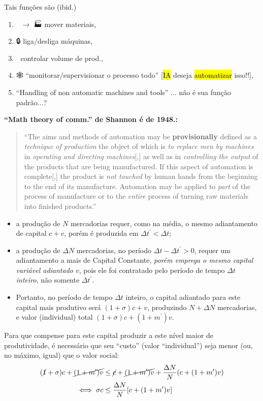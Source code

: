 Tais funções são (ibid.)

\begin{enumerate}
\item 🚜 $\rightarrow$ 🏭 mover materiais,
\item 🔒 liga/desliga máquinas,
\item 🧭 controlar volume de prod.,
\item 🕸️ ``monitorar/supervisionar o processo todo'' [\hl{IA} deseja \hl{automatizar} isso!!],
\item ``Handling of non automatic machines and tools'' $\dots$ não é sua função padrão...?
\end{enumerate}

\textbf{``Math theory of comm.'' de Shannon é de 1948.:} 
\begin{quote}
``The aims and methods of automation may be \textbf{provisionally} defined as a \textit{technique of production} the object of which is \textit{to replace men by machines} in \textit{operating and directing machines}[,] as well as in \textit{controlling the output} of the products that are being manufactured. If this aspect of automation is complete[,] the product is \textit{not touched} by human hands from the beginning to the end of its manufacture. Automation may be applied to \textit{part} of the process of manufacture or to the \textit{entire} process of turning raw materials into finished products.''  \parencite[p. 5, grifo meu]{Pollock1957}
\end{quote}

\begin{itemize}
\item a produção de $N$ mercadorias requer, como na média, o mesmo adiantamento de capital $c+v$, porém é produzida em $\Delta t^{\prime}<\Delta t$;
\item a produção de $\Delta N$ mercadorias, no período $\Delta t-\Delta t^{\prime}>0$, requer um adiantamento a mais de Capital Constante, \textit{porém emprega o mesmo capital variável adiantado $v$}, pois ele foi contratado pelo período de tempo $\Delta t$ \textit{inteiro}, não somente $\Delta t^{\prime}$.
\item Portanto, no período de tempo $\Delta t$ inteiro, o capital adiantado para este capital mais produtivo será $(1+\sigma)c + v$, produzindo $N+\Delta N$ mercadorias, e valor (individual) total $(1+\sigma)c + (1+m^{\prime})v$.
\end{itemize}

Para que compense para este capital produzir a este nível maior de produtividade, é necessário que seu ``custo'' (valor ``individual'') seja menor (ou, no máximo, igual) que o valor social:
\begin{align*}
(\cancel{ 1 }+\sigma)c + \cancel{ (1 +m^{\prime})v } &\leq \cancel{ c }+\cancel{ (1+m^{\prime})v } + \frac{\Delta N}{N}(c+(1+m^{\prime})v) \\
\iff \sigma c & \leq \frac{\Delta N}{N}[c+(1+m^{\prime})v]
\end{align*}

